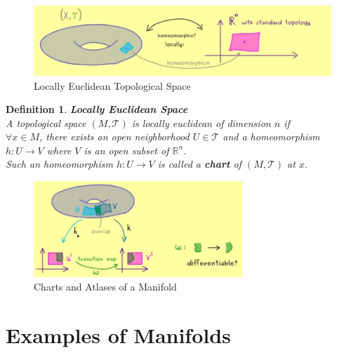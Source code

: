 \documentclass[11pt]{book} %
\newtheorem{definition}{Definition}[section]
\begin{document}
\begin{figure}[H]
    \centering
    \includegraphics[width=\textwidth]{Figs/locally_euclidean_topological_space.png}
    \caption{Locally Euclidean Topological Space}
\end{figure}

\begin{definition}{\textbf{Locally Euclidean Space}} \\
    A topological space \( (M, \mathcal{T}) \) is locally euclidean of dimension \( n \) if \\ 
    \(\forall x \in M \), there exists an open neighborhood \( U \in \mathcal{T} \) and a homeomorphism \( h: U \to V \) where \( V \) is an open subset of \( \mathbb{R}^n \). \\
    Such an homeomorphism \( h: U \to V \) is called a \textbf{chart} of \( (M , \mathcal{T}) \) at \( x \).
\end{definition}

\begin{figure}[H]
    \centering
    \includegraphics[width=0.7\textwidth]{Figs/chart_of_manifold.png}
    \caption{Charts and Atlases of a Manifold}
\end{figure}




\section{Examples of Manifolds}
\end{document}
